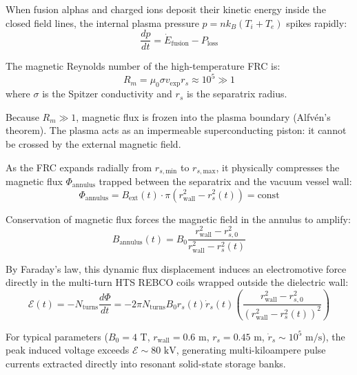 \documentclass[10pt,twocolumn]{article}
\begin{document}
When fusion alphas and charged ions deposit their kinetic energy inside the closed field lines, the internal plasma pressure $p = n k_B (T_i + T_e)$ spikes rapidly:
\begin{equation}
  \frac{dp}{dt} = \dot{E}_{\text{fusion}} - P_{\text{loss}}
\end{equation}

The magnetic Reynolds number of the high-temperature FRC is:
\begin{equation}
  R_m = \mu_0 \sigma v_{\text{exp}} r_s \approx 10^5 \gg 1
\end{equation}
where $\sigma$ is the Spitzer conductivity and $r_s$ is the separatrix radius.

Because $R_m \gg 1$, magnetic flux is frozen into the plasma boundary (Alfvén's theorem). The plasma acts as an impermeable superconducting piston: it cannot be crossed by the external magnetic field.

As the FRC expands radially from $r_{s,\text{min}}$ to $r_{s,\text{max}}$, it physically compresses the magnetic flux $\Phi_{\text{annulus}}$ trapped between the separatrix and the vacuum vessel wall:
\begin{equation}
  \Phi_{\text{annulus}} = B_{\text{ext}}(t) \cdot \pi \left( r_{\text{wall}}^2 - r_s^2(t) \right) = \text{const}
\end{equation}

Conservation of magnetic flux forces the magnetic field in the annulus to amplify:
\begin{equation}
  B_{\text{annulus}}(t) = B_0 \frac{r_{\text{wall}}^2 - r_{s,0}^2}{r_{\text{wall}}^2 - r_s^2(t)}
\end{equation}

By Faraday's law, this dynamic flux displacement induces an electromotive force directly in the multi-turn HTS REBCO coils wrapped outside the dielectric wall:
\begin{equation}
  \mathcal{E}(t) = -N_{\text{turns}} \frac{d\Phi}{dt} = -2\pi N_{\text{turns}} B_0 r_s(t) \dot{r}_s(t) \left( \frac{r_{\text{wall}}^2 - r_{s,0}^2}{(r_{\text{wall}}^2 - r_s^2(t))^2} \right)
\end{equation}

For typical parameters ($B_0 = 4\text{ T}$, $r_{\text{wall}} = 0.6\text{ m}$, $r_s = 0.45\text{ m}$, $\dot{r}_s \sim 10^5\text{ m/s}$), the peak induced voltage exceeds $\mathcal{E} \sim 80\text{ kV}$, generating multi-kiloampere pulse currents extracted directly into resonant solid-state storage banks.
\end{document}
